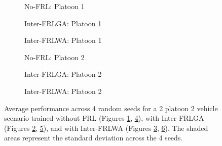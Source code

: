 \begin{figure}[H]
\centering
    \begin{subfigure}{\interfrlRewWidth\textwidth}
        \raggedleft
        
       \caption{No-FRL: Platoon 1}\label{fig:avgep_pl1reward_nofrl}
    \end{subfigure}\hspace{\interfrlRewSpace}
    \begin{subfigure}{\interfrlRewWidth\textwidth}
        \raggedleft
        
       \caption{Inter-FRLGA: Platoon 1}\label{fig:avgep_pl1reward_grads}
    \end{subfigure}\hspace{\interfrlRewSpace}
    \begin{subfigure}{\interfrlRewWidth\textwidth}
        \raggedleft
        
       \caption{Inter-FRLWA: Platoon 1}\label{fig:avgep_pl1reward_weight}
    \end{subfigure}
    \begin{subfigure}{\interfrlRewWidth\textwidth}
        \raggedleft
        
       \caption{No-FRL: Platoon 2}\label{fig:avgep_pl2reward_nofrl}
    \end{subfigure}\hspace{\interfrlRewSpace}
    \begin{subfigure}{\interfrlRewWidth\textwidth}
        \raggedleft
        
       \caption{Inter-FRLGA: Platoon 2}\label{fig:avgep_pl2reward_grads}
    \end{subfigure}\hspace{\interfrlRewSpace}
    \begin{subfigure}{\interfrlRewWidth\textwidth}
        \raggedleft
        
       \caption{Inter-FRLWA: Platoon 2}\label{fig:avgep_pl2reward_weight}
    \end{subfigure}
\caption{Average performance across 4 random seeds for a 2 platoon 2 vehicle scenario trained without FRL (Figures \ref{fig:avgep_pl1reward_nofrl}, \ref{fig:avgep_pl2reward_nofrl}), with Inter-FRLGA (Figures \ref{fig:avgep_pl1reward_grads}, \ref{fig:avgep_pl2reward_grads}), and with Inter-FRLWA (Figures \ref{fig:avgep_pl1reward_weight}, \ref{fig:avgep_pl2reward_weight}). The shaded areas represent the standard deviation across the 4 seeds.}
\label{fig:inter_avep_rew}
\end{figure}

